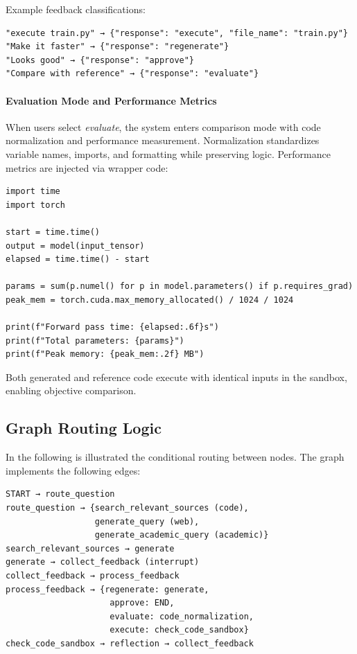 Example feedback classifications:

\begin{verbatim}
"execute train.py" → {"response": "execute", "file_name": "train.py"}
"Make it faster" → {"response": "regenerate"}
"Looks good" → {"response": "approve"}
"Compare with reference" → {"response": "evaluate"}
\end{verbatim}

\paragraph{Evaluation Mode and Performance Metrics}
When users select \textit{evaluate}, the system enters comparison mode with code normalization and performance measurement. Normalization standardizes variable names, imports, and formatting while preserving logic. Performance metrics are injected via wrapper code:

\begin{verbatim}
import time
import torch

start = time.time()
output = model(input_tensor)
elapsed = time.time() - start

params = sum(p.numel() for p in model.parameters() if p.requires_grad)
peak_mem = torch.cuda.max_memory_allocated() / 1024 / 1024

print(f"Forward pass time: {elapsed:.6f}s")
print(f"Total parameters: {params}")
print(f"Peak memory: {peak_mem:.2f} MB")
\end{verbatim}

Both generated and reference code execute with identical inputs in the sandbox, enabling objective comparison.



\subsection{Graph Routing Logic}
In the following is illustrated the conditional routing between nodes. The graph implements the following edges:

\begin{verbatim}
START → route_question
route_question → {search_relevant_sources (code), 
                  generate_query (web), 
                  generate_academic_query (academic)}
search_relevant_sources → generate
generate → collect_feedback (interrupt)
collect_feedback → process_feedback
process_feedback → {regenerate: generate,
                     approve: END,
                     evaluate: code_normalization,
                     execute: check_code_sandbox}
check_code_sandbox → reflection → collect_feedback
\end{verbatim}

